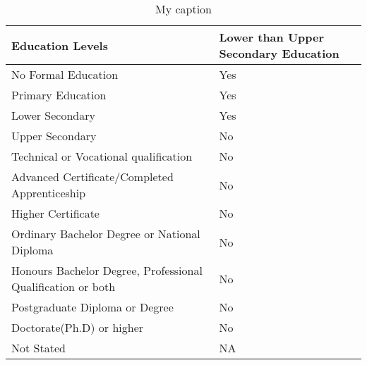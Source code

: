 \begin{table}[H]
	\centering
	\label{my-label}
	\begin{tabular}{|p{5cm}|p{5cm}|}
		\hline
		\textbf{Education Levels}                                   & \textbf{Lower than Upper Secondary Education} \\ \hline
		No Formal Education                                         & Yes                                           \\ \hline
		Primary Education                                           & Yes                                           \\ \hline
		Lower Secondary                                             & Yes                                           \\ \hline
		Upper Secondary                                             & No                                            \\ \hline
		Technical or Vocational qualification                       & No                                            \\ \hline
		Advanced Certificate/Completed Apprenticeship               & No                                            \\ \hline
		Higher Certificate                                          & No                                            \\ \hline
		Ordinary Bachelor Degree or National Diploma                & No                                            \\ \hline
		Honours Bachelor Degree, Professional Qualification or both & No                                            \\ \hline
		Postgraduate Diploma or Degree                              & No                                            \\ \hline
		Doctorate(Ph.D) or higher                                   & No                                            \\ \hline
		Not Stated                                                  & NA                                            \\ \hline
	\end{tabular}
	\caption{My caption}
\end{table}

